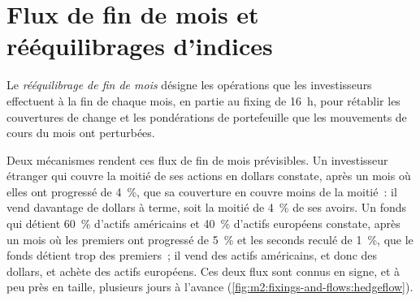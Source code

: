 \section{Flux de fin de mois et rééquilibrages d'indices}

\begin{definition}\label{def:m2:fixings-and-flows:monthend}
Le \emph{rééquilibrage de fin de mois} désigne les
opérations que les investisseurs effectuent à la fin de chaque mois, en partie au fixing de 16~h, pour
rétablir les couvertures de change et les pondérations de portefeuille que les mouvements de cours du mois ont
perturbées.
\end{definition}

Deux mécanismes rendent ces flux de fin de mois prévisibles. Un investisseur étranger qui couvre
la moitié de ses actions en dollars constate, après un mois où elles ont progressé de 4~\%, que sa
couverture en couvre moins de la moitié~: il vend davantage de dollars à terme, soit la moitié de 4~\% de ses
avoirs. Un fonds qui détient 60~\% d'actifs américains et 40~\% d'actifs européens
constate, après un mois où les premiers ont progressé de 5~\% et les seconds reculé de 1~\%,
que le fonds détient trop des premiers~; il vend des actifs américains, et donc des dollars, et achète
des actifs européens. Ces deux flux sont connus en signe, et à peu près en taille, plusieurs jours
à l'avance (\cref{fig:m2:fixings-and-flows:hedgeflow}).

\begin{omfigure}

\label{fig:m2:fixings-and-flows:hedgeflow}
\end{omfigure}

